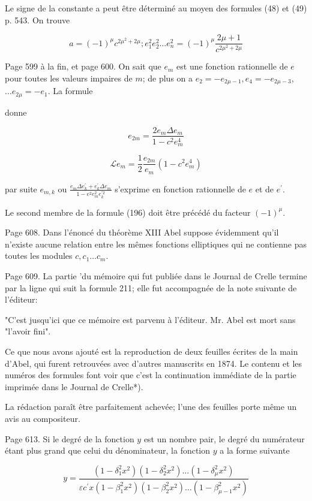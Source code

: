\documentclass{article}
\begin{document}
Le signe de la constante a peut être déterminé au moyen des formules (48) et (49) p. 543. On trouve

\[
a=(-1)^{\mu} c^{2 \mu^{2}+2 \mu} ; e_{1}^{2} e_{2}^{2} \ldots e_{n}^{2}=(-1)^{\mu} \frac{2 \mu+1}{c^{2 \mu^{2}+2 \mu}}
\]

Page 599 à la fin, et page 600. On sait que \(e_{m}\) est une fonction rationnelle de \(e\) pour toutes les valeurs impaires de \(m\); de plus on a \(e_{2}=-e_{2 \mu-1}, e_{4}=-e_{2 \mu-3}\), \(\ldots e_{2 \mu}=-e_{1}\). La formule

donne

\[
e_{2 m}=\frac{2 e_{m} \Delta e_{m}}{1-c^{2} e_{m}^{4}}
\]

\[
\mathcal{L} e_{m}=\frac{1}{2} \frac{e_{2 m}}{e_{m}}\left(1-c^{2} e_{m}^{4}\right)
\]

par suite \(e_{m, k}\) ou \(\frac{e_{m} \Delta e_{k}^{\prime}+e_{k}^{\prime} \Delta e_{m}}{1-e^{2} e_{m}^{2} e_{k}^{\prime 2}}\) s'exprime en fonction rationnelle de \(e\) et de \(e^{\prime}\).

Le second membre de la formule (196) doit être précédé du facteur \((-1)^{\mu}\).

Page 608. Dans l'énoncé du théorème XIII Abel suppose évidemment qu'il n'existe aucune relation entre les mêmes fonctions elliptiques qui ne contienne pas toutes les modules \(c, c_{1} \ldots c_{m}\).

Page 609. La partie 'du mémoire qui fut publiée dans le Journal de Crelle termine par la ligne qui suit la formule 211; elle fut accompagnée de la note suivante de l'éditeur:

"C'est jusqu'ici que ce mémoire est parvenu à l'éditeur. Mr. Abel est mort sans "l'avoir fini".

Ce que nous avons ajouté est la reproduction de deux feuilles écrites de la main d'Abel, qui furent retrouvées avec d'autres manuscrits en 1874. Le contenu et les numéros des formules font voir que c'est la continuation immédiate de la partie imprimée dans le Journal de Crelle*).

La rédaction paraît être parfaitement achevée; l'une des feuilles porte même un avis au compositeur.

Page 613. Si le degré de la fonction \(y\) est un nombre pair, le degré du numérateur étant plus grand que celui du dénominateur, la fonction \(y\) a la forme suivante

\[
y=\frac{\left(1-\delta_{1}^{2} x^{2}\right)\left(1-\delta_{2}^{2} x^{2}\right) \ldots\left(1-\delta_{\mu}^{2} x^{2}\right)}{\varepsilon c^{\prime} x\left(1-\beta_{1}^{2} x^{2}\right)\left(1-\beta_{2}^{2} x^{2}\right) \ldots\left(1-\beta_{\mu-1}^{2} x^{2}\right)}
\]
\end{document}
